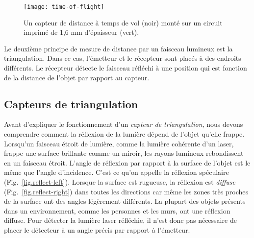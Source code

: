 \begin{figure}
\texttt{[image: time-of-flight]}
\caption{Un capteur de distance à temps de vol (noir) monté sur un circuit imprimé de 1,6 mm d'épaisseur (vert).}\label{fig.ir}
\end{figure}

Le deuxième principe de mesure de distance par un faisceau lumineux est la triangulation. Dans ce cas, l'émetteur et le récepteur sont placés à des endroits différents. Le récepteur détecte le faisceau réfléchi à une position qui est fonction de la distance de l'objet par rapport au capteur.

\subsection{Capteurs de triangulation}\label{s.triangulating-sensors}

Avant d'expliquer le fonctionnement d'un \emph{capteur de triangulation}, nous devons comprendre comment la réflexion de la lumière dépend de l'objet qu'elle frappe. Lorsqu'un faisceau étroit de lumière, comme la lumière cohérente d'un laser, frappe une surface brillante comme un miroir, les rayons lumineux rebondissent en un faisceau étroit. L'angle de réflexion par rapport à la surface de l'objet est le même que l'angle d'incidence. C'est ce qu'on appelle la réflexion spéculaire (Fig.~\ref{fig.reflect-left}). Lorsque la surface est rugueuse, la réflexion est \emph{diffuse} (Fig.~\ref{fig.reflect-right}) dans toutes les directions car même les zones très proches de la surface ont des angles légèrement différents. La plupart des objets présents dans un environnement, comme les personnes et les murs, ont une réflexion diffuse. Pour détecter la lumière laser réfléchie, il n'est donc pas nécessaire de placer le détecteur à un angle précis par rapport à l'émetteur.

